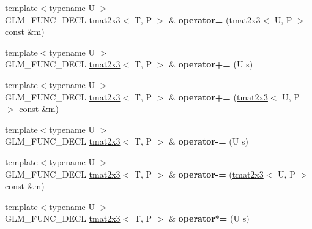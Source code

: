 \begin{DoxyCompactItemize}
\item 
\hypertarget{structglm_1_1tmat2x3_afaeb9829210555e86d1bce194f4f57c2}{{\footnotesize template$<$typename U $>$ }\\G\-L\-M\-\_\-\-F\-U\-N\-C\-\_\-\-D\-E\-C\-L \hyperlink{structglm_1_1tmat2x3}{tmat2x3}$<$ T, P $>$ \& {\bfseries operator=} (\hyperlink{structglm_1_1tmat2x3}{tmat2x3}$<$ U, P $>$ const \&m)}\label{structglm_1_1tmat2x3_afaeb9829210555e86d1bce194f4f57c2}

\item 
\hypertarget{structglm_1_1tmat2x3_aee083f086e7c9f50519938741a380cd3}{{\footnotesize template$<$typename U $>$ }\\G\-L\-M\-\_\-\-F\-U\-N\-C\-\_\-\-D\-E\-C\-L \hyperlink{structglm_1_1tmat2x3}{tmat2x3}$<$ T, P $>$ \& {\bfseries operator+=} (U s)}\label{structglm_1_1tmat2x3_aee083f086e7c9f50519938741a380cd3}

\item 
\hypertarget{structglm_1_1tmat2x3_ac76cd77cbb00903d4ec4cb7a1ccd386c}{{\footnotesize template$<$typename U $>$ }\\G\-L\-M\-\_\-\-F\-U\-N\-C\-\_\-\-D\-E\-C\-L \hyperlink{structglm_1_1tmat2x3}{tmat2x3}$<$ T, P $>$ \& {\bfseries operator+=} (\hyperlink{structglm_1_1tmat2x3}{tmat2x3}$<$ U, P $>$ const \&m)}\label{structglm_1_1tmat2x3_ac76cd77cbb00903d4ec4cb7a1ccd386c}

\item 
\hypertarget{structglm_1_1tmat2x3_a2e62101b40eddd5795cd3c9f94315d43}{{\footnotesize template$<$typename U $>$ }\\G\-L\-M\-\_\-\-F\-U\-N\-C\-\_\-\-D\-E\-C\-L \hyperlink{structglm_1_1tmat2x3}{tmat2x3}$<$ T, P $>$ \& {\bfseries operator-\/=} (U s)}\label{structglm_1_1tmat2x3_a2e62101b40eddd5795cd3c9f94315d43}

\item 
\hypertarget{structglm_1_1tmat2x3_a7d1c13018b5d2ad3fd2a13fcf03930d1}{{\footnotesize template$<$typename U $>$ }\\G\-L\-M\-\_\-\-F\-U\-N\-C\-\_\-\-D\-E\-C\-L \hyperlink{structglm_1_1tmat2x3}{tmat2x3}$<$ T, P $>$ \& {\bfseries operator-\/=} (\hyperlink{structglm_1_1tmat2x3}{tmat2x3}$<$ U, P $>$ const \&m)}\label{structglm_1_1tmat2x3_a7d1c13018b5d2ad3fd2a13fcf03930d1}

\item 
\hypertarget{structglm_1_1tmat2x3_a1e3a222eff6b88c77d35ab5efbb0afcf}{{\footnotesize template$<$typename U $>$ }\\G\-L\-M\-\_\-\-F\-U\-N\-C\-\_\-\-D\-E\-C\-L \hyperlink{structglm_1_1tmat2x3}{tmat2x3}$<$ T, P $>$ \& {\bfseries operator$\ast$=} (U s)}\label{structglm_1_1tmat2x3_a1e3a222eff6b88c77d35ab5efbb0afcf}


\end{DoxyCompactItemize}
